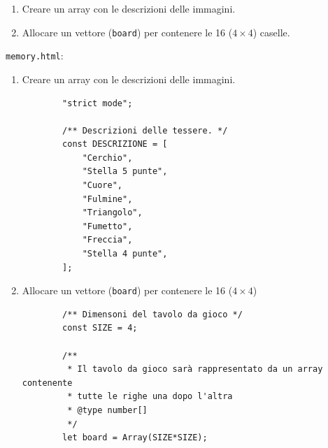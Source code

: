 \begin{frame}\transfade
  \begin{exercise}\centering
    \begin{enumerate}
      \item Creare un array con le descrizioni delle immagini.
      \item Allocare un vettore (\texttt{board}) per contenere le 16 ($4\times4$) caselle.
    \end{enumerate}
  \end{exercise}
\end{frame}

\begin{frame}[fragile]\transfade
  \begin{sol}\centering
    \texttt{memory.html}:
    \begin{enumerate}
      \item Creare un array con le descrizioni delle immagini.
      \begin{verbatim}
        "strict mode";

        /** Descrizioni delle tessere. */
        const DESCRIZIONE = [
            "Cerchio",
            "Stella 5 punte",
            "Cuore",
            "Fulmine",
            "Triangolo",
            "Fumetto",
            "Freccia",
            "Stella 4 punte",
        ];
      \end{verbatim}
    \end{enumerate}
  \end{sol}
\end{frame}
\begin{frame}[fragile]\transfade
  \begin{sol}\centering
    \begin{enumerate}
    \setcounter{enumi}{1}
      \item Allocare un vettore (\texttt{board}) per contenere le 16 ($4\times4$)
      \begin{verbatim}
        /** Dimensoni del tavolo da gioco */
        const SIZE = 4;

        /**
         * Il tavolo da gioco sarà rappresentato da un array contenente
         * tutte le righe una dopo l'altra
         * @type number[]
         */
        let board = Array(SIZE*SIZE);
      \end{verbatim}
    \end{enumerate}
  \end{sol}
\end{frame}
